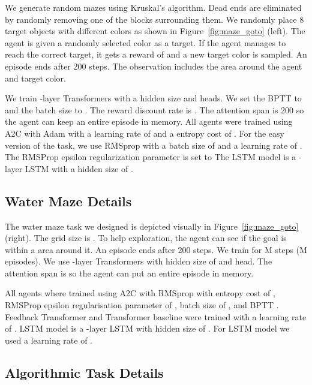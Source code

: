 \documentclass{article} \usepackage{iclr2021_conference}
\newcommand{\fig}[1]{Figure~\ref{fig:#1}}
\begin{document}
We generate random  mazes using Kruskal's algorithm.
Dead ends are eliminated by randomly removing one of the blocks surrounding them. 
We  randomly place 8 target objects with different colors as shown in \fig{maze_goto} (left).
The agent is given a randomly selected color as a target. 
If the agent manages to reach the correct target, it gets a reward of  and a new target color is sampled. An episode ends after 200 steps. The observation includes the  area around the agent and target color.

We train -layer Transformers with a hidden size  and  heads.  
We set the BPTT to  and the batch size to . The reward discount rate is . The attention span is 200 so the agent can keep an entire episode in memory.
All agents were trained using A2C with Adam with a learning rate of  and a entropy cost of . 
For the easy version of the task, we use RMSprop with a batch size of  and a learning rate of . The RMSProp epsilon regularization parameter is set to 
The LSTM model is a -layer LSTM with a hidden size of .

\subsection{Water Maze Details}

The water maze task we designed is depicted visually in \fig{maze_goto} (right).
The grid size is . To help exploration, the agent can see if the goal is within a  area around it. An episode ends after 200 steps.
We train for M steps (M episodes).  We use -layer Transformers with hidden size of  and  head. The attention span is  so the agent can put an entire episode in memory. 

All agents where trained using A2C with RMSprop with entropy cost of , RMSProp epsilon regularisation parameter of , batch size of , and BPTT . Feedback Transformer and Transformer baseline were trained with a learning rate of . LSTM model is a -layer LSTM with hidden size of . For LSTM model we used a learning rate of . 

\subsection{Algorithmic Task Details}
\end{document}
